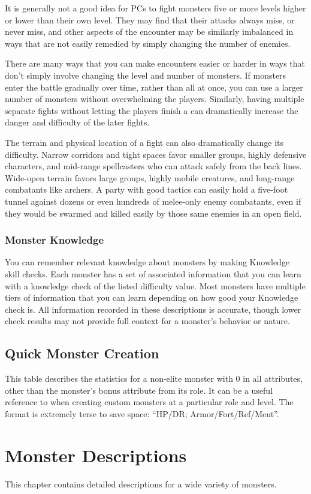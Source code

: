         It is generally not a good idea for PCs to fight monsters five or more levels higher or lower than their own level.
        They may find that their attacks always miss, or never miss, and other aspects of the encounter may be similarly imbalanced in ways that are not easily remedied by simply changing the number of enemies.

        There are many ways that you can make encounters easier or harder in ways that don't simply involve changing the level and number of monsters.
        If monsters enter the battle gradually over time, rather than all at once, you can use a larger number of monsters without overwhelming the players.
        Similarly, having multiple separate fights without letting the players finish a  can dramatically increase the danger and difficulty of the later fights.

        The terrain and physical location of a fight can also dramatically change its difficulty.
        Narrow corridors and tight spaces favor smaller groups, highly defensive characters, and mid-range spellcasters who can attack safely from the back lines.
        Wide-open terrain favors large groups, highly mobile creatures, and long-range combatants like archers.
        A party with good tactics can easily hold a five-foot tunnel against dozens or even hundreds of melee-only enemy combatants, even if they would be swarmed and killed easily by those same enemies in an open field.

    \subsection{Monster Knowledge}
        You can remember relevant knowledge about monsters by making Knowledge skill checks.
        Each monster has a set of associated information that you can learn with a knowledge check of the listed difficulty value.
        Most monsters have multiple tiers of information that you can learn depending on how good your Knowledge check is.
        All information recorded in these descriptions is accurate, though lower check results may not provide full context for a monster's behavior or nature.

\section{Quick Monster Creation}

    This table describes the statistics for a non-elite monster with 0 in all attributes, other than the monster's bonus attribute from its role.
    It can be a useful reference to when creating custom monsters at a particular role and level.
    The format is extremely terse to save space: ``HP/DR; Armor/Fort/Ref/Ment''.

    

\chapter{Monster Descriptions}

This chapter contains detailed descriptions for a wide variety of monsters.


